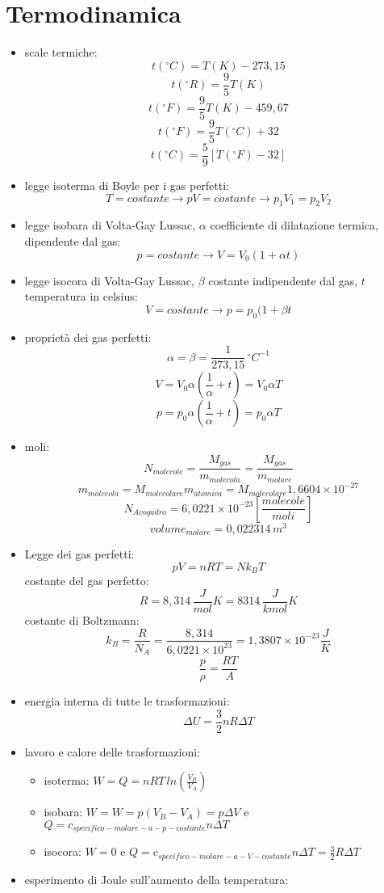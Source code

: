 \documentclass[a4paper,12pt, oneside]{book}
\begin{document}
\section{Termodinamica}
\begin{itemize}
\item scale termiche:
$$t(^{\circ}C)=T(K)-273,15$$
$$t(^{\circ}R)=\frac{9}{5} T(K)$$
$$t(^{\circ}F)=\frac{9}{5} T(K)-459,67$$
$$t(^{\circ}F)=\frac{9}{5} T(^{\circ}C)+32$$
$$t(^{\circ}C)=\frac{5}{9} [T(^{\circ}F)-32]$$
\item legge isoterma di Boyle per i gas perfetti:
$$T=costante\to pV=costante\to p_1V_1=p_2V_2$$
\item legge isobara di Volta-Gay Lussac, $\alpha$ coefficiente di dilatazione termica, dipendente dal gas:
$$p=costante\to V=V_0(1+\alpha t)$$
\item legge isocora di Volta-Gay Lussac, $\beta$ costante indipendente dal gas, $t$ temperatura in celsius:
$$V=costante\to p=p_0(1+\beta t$$
\item proprietà dei gas perfetti:
$$\alpha=\beta=\frac{1}{273,15} {\,}^\circ C^{-1}$$
$$V=V_0\alpha\left(\frac{1}{\alpha}+t\right)=V_0\alpha T$$
$$p=p_0\alpha\left(\frac{1}{\alpha}+t\right)=p_0\alpha T$$
\item moli:
$$N_{molecole}=\frac{M_{gas}}{m_{molecola}}=\frac{M_{gas}}{m_{molare}}$$
$$m_{molecola}=M_{molecolare}m_{atomica}=M_{molecolare}1,6604\times 10^{-27}$$
$$N_{Avogadro}=6,0221\times 10^{-23}\left[\frac{molecole}{moli}\right]$$
$$volume_{molare}=0,022314\,m^3$$
\item Legge dei gas perfetti:
$$pV=nRT=Nk_BT$$
costante del gas perfetto:
$$R=8,314\,\frac{J}{mol}K=8314\,\frac{J}{kmol}K$$
costante di Boltzmann:
$$k_B=\frac{R}{N_A}=\frac{8,314}{6,0221\times 10^{23}}=1,3807\times 10^{-23}\frac{J}{K}$$
$$\frac{p}{\rho}=\frac{RT}{A}$$
\item energia interna di tutte le trasformazioni:
$$\Delta U=\frac{3}{2}nR\Delta T$$
\item lavoro e calore delle trasformazioni:
\begin{itemize}
\item isoterma: $W=Q=nRT\,ln\left(\frac{V_B}{V_A}\right)$
\item isobara: $W=W=p(V_B-V_A)=p\Delta V$ e
				$Q=c_{specifico-molare-a-p-costante}n\Delta T$
\item isocora: $W=0$ e $Q=c_{specifico-molare-a-V-costante}n\Delta T=\frac{3}{2}R\Delta T$
\end{itemize}
\item esperimento di Joule sull'aumento della temperatura:

\end{itemize}
\end{document}
